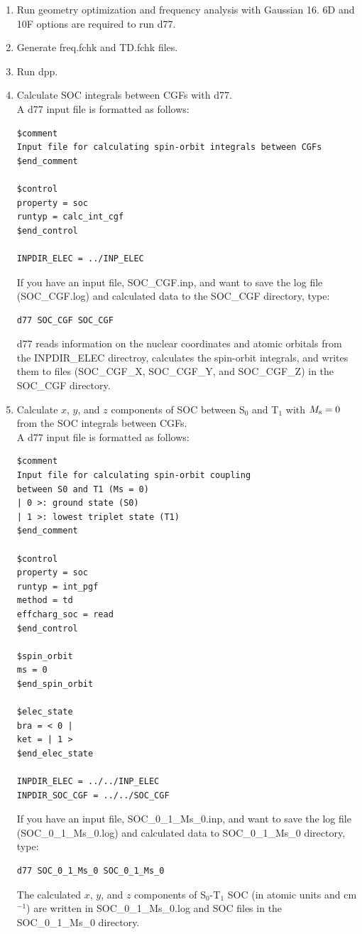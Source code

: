 ﻿\documentclass[11pt,a4paper,openany]{article}
\begin{document}
\begin{enumerate}

\item{Run geometry optimization and frequency analysis with Gaussian 16. 6D and 10F options are required to run d77.}
\item{Generate freq.fchk and TD.fchk files.}
\item{Run dpp.}

\item{Calculate SOC integrals between CGFs with d77.\\
A d77 input file is formatted as follows:
\begin{verbatim}
$comment
Input file for calculating spin-orbit integrals between CGFs
$end_comment

$control
property = soc
runtyp = calc_int_cgf
$end_control

INPDIR_ELEC = ../INP_ELEC
\end{verbatim}
If you have an input file, SOC\_CGF.inp, and want to save the log file (SOC\_CGF.log) and calculated data to the SOC\_CGF directory, type:
\begin{verbatim} 
d77 SOC_CGF SOC_CGF
\end{verbatim}
d77 reads information on the nuclear coordinates and atomic orbitals from \\
the INPDIR\_ELEC directroy, calculates the spin-orbit integrals, and writes them to files (SOC\_CGF\_X, SOC\_CGF\_Y, and SOC\_CGF\_Z) in the SOC\_CGF directory.
}

\item{
Calculate $x$, $y$, and $z$ components of SOC between S$_0$ and T$_1$ with $M_{\rm{s}} = 0$ from the SOC integrals between CGFs.\\
A d77 input file is formatted as follows:
\begin{verbatim} 
$comment
Input file for calculating spin-orbit coupling
between S0 and T1 (Ms = 0)
| 0 >: ground state (S0)
| 1 >: lowest triplet state (T1)
$end_comment

$control
property = soc
runtyp = int_pgf
method = td
effcharg_soc = read
$end_control

$spin_orbit
ms = 0
$end_spin_orbit

$elec_state
bra = < 0 |
ket = | 1 >
$end_elec_state

INPDIR_ELEC = ../../INP_ELEC
INPDIR_SOC_CGF = ../../SOC_CGF
\end{verbatim}
If you have an input file, SOC\_0\_1\_Ms\_0.inp, and want to save the log file (SOC\_0\_1\_Ms\_0.log) and calculated data to SOC\_0\_1\_Ms\_0 directory, type:
\begin{verbatim} 
d77 SOC_0_1_Ms_0 SOC_0_1_Ms_0
\end{verbatim}
The calculated $x$, $y$, and $z$ components of S$_0$-T$_1$ SOC (in atomic units and cm$^{-1}$) are written in SOC\_0\_1\_Ms\_0.log and SOC files in the SOC\_0\_1\_Ms\_0 directory.
}


\end{enumerate}
\end{document}
